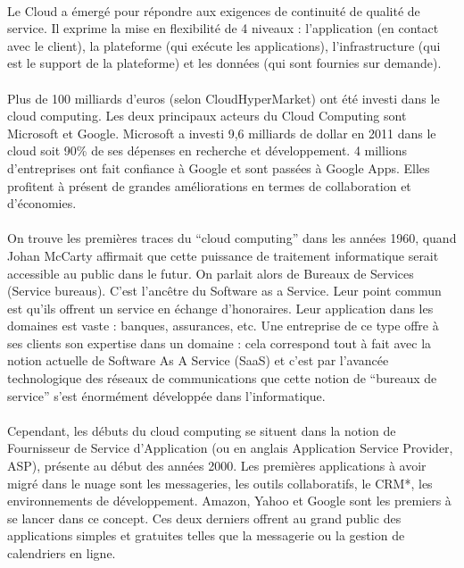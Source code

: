 \documentclass[a4paper,12pt]{report}
\begin{document}
\begin{onehalfspace}
	\paragraph*{}
	Le Cloud a émergé pour répondre aux exigences de continuité de qualité de service. Il exprime la mise en flexibilité de 4 niveaux : l’application (en contact avec le client), la plateforme (qui exécute les applications), l’infrastructure (qui est le support de la plateforme) et les données (qui sont fournies sur demande).
	
	\paragraph*{}
	Plus de 100 milliards d’euros (selon CloudHyperMarket) ont été investi dans le cloud computing. Les deux principaux acteurs du Cloud Computing sont Microsoft et Google. Microsoft a investi 9,6 milliards de dollar en 2011 dans le cloud soit 90\% de ses dépenses en recherche et développement. 4 millions d’entreprises ont fait confiance à Google et sont passées à Google Apps. Elles profitent à présent de grandes améliorations en termes de collaboration et d'économies.
	
	\paragraph*{}
	On trouve les premières traces du “cloud computing” dans les années 1960, quand Johan McCarty affirmait que cette puissance de traitement informatique serait accessible au public dans le futur. On parlait alors de Bureaux de Services (Service bureaus). C’est l’ancêtre du Software as a Service. Leur point commun est qu’ils offrent un service en échange d’honoraires. Leur application dans les domaines est vaste : banques, assurances, etc. Une entreprise de ce type offre à ses clients son expertise dans un domaine : cela correspond tout à fait avec la notion actuelle de Software As A Service (SaaS) et c’est par l’avancée technologique des réseaux de communications que cette notion de “bureaux de service”  s’est énormément développée dans l’informatique.
	
	\paragraph*{}
	Cependant, les débuts du cloud computing se situent dans la notion de Fournisseur de Service d’Application (ou en anglais Application Service Provider, ASP), présente au début des années 2000. Les premières applications à avoir migré dans le nuage sont les messageries, les outils collaboratifs, le CRM*, les environnements de développement. Amazon, Yahoo et Google sont les premiers à se lancer dans ce concept. Ces deux derniers offrent au grand public des applications simples et gratuites telles que la messagerie ou la gestion de calendriers en ligne.
	

\end{onehalfspace}
\end{document}

